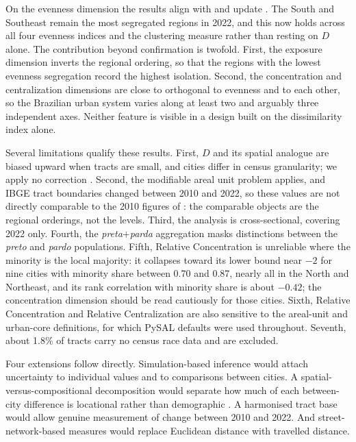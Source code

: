 \documentclass[12pt,a4paper]{article}
\begin{document}
On the evenness dimension the results align with and update \citet{deSouza2023nationwide_english}. The South and Southeast remain the most segregated regions in 2022, and this now holds across all four evenness indices and the clustering measure rather than resting on $D$ alone. The contribution beyond confirmation is twofold. First, the exposure dimension inverts the regional ordering, so that the regions with the lowest evenness segregation record the highest isolation. Second, the concentration and centralization dimensions are close to orthogonal to evenness and to each other, so the Brazilian urban system varies along at least two and arguably three independent axes. Neither feature is visible in a design built on the dissimilarity index alone.

Several limitations qualify these results. First, $D$ and its spatial analogue are biased upward when tracts are small, and cities differ in census granularity; we apply no correction \citep{cortese1976further, carrington1997measuring, allen2015more}. Second, the modifiable areal unit problem applies, and IBGE tract boundaries changed between 2010 and 2022, so these values are not directly comparable to the 2010 figures of \citet{deSouza2023nationwide_english}: the comparable objects are the regional orderings, not the levels. Third, the analysis is cross-sectional, covering 2022 only. Fourth, the \emph{preta}$+$\emph{parda} aggregation masks distinctions between the \emph{preto} and \emph{pardo} populations. Fifth, Relative Concentration is unreliable where the minority is the local majority: it collapses toward its lower bound near $-2$ for nine cities with minority share between 0.70 and 0.87, nearly all in the North and Northeast, and its rank correlation with minority share is about $-0.42$; the concentration dimension should be read cautiously for those cities. Sixth, Relative Concentration and Relative Centralization are also sensitive to the areal-unit and urban-core definitions, for which PySAL defaults were used throughout. Seventh, about 1.8\% of tracts carry no census race data and are excluded.

Four extensions follow directly. Simulation-based inference would attach uncertainty to individual values and to comparisons between cities. A spatial-versus-compositional decomposition would separate how much of each between-city difference is locational rather than demographic \citep{rey2021comparative}. A harmonised tract base would allow genuine measurement of change between 2010 and 2022. And street-network-based measures would replace Euclidean distance with travelled distance.
\end{document}
